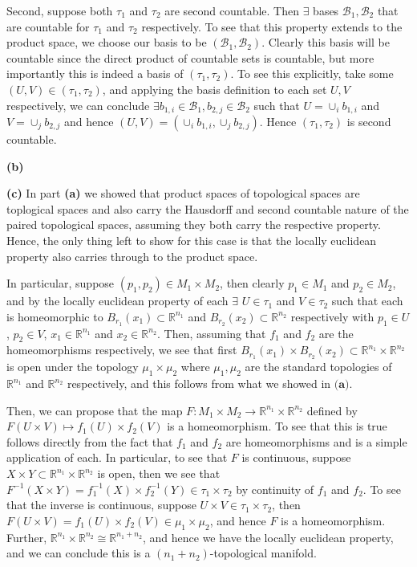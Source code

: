 \documentclass[10pt]{article}
\newcommand{\R}{\mathbb{R}}
\begin{document}
Second, suppose both $\tau_{1}$ and $\tau_{2}$ are second countable. Then $\exists$ bases $\mathcal{B}_{1},\mathcal{B}_{2}$ that are countable for $\tau_{1}$ and $\tau_{2}$ respectively. To see that this property extends to the product space, we choose our basis to be $(\mathcal{B}_{1},\mathcal{B}_{2})$. Clearly this basis will be countable since the direct product of countable sets is countable, but more importantly this is indeed a basis of $(\tau_{1},\tau_{2})$. To see this explicitly, take some $(U,V)\in (\tau_{1},\tau_{2})$, and applying the basis definition to each set $U,V$ respectively, we can conclude $\exists b_{1,i}\in \mathcal{B}_{1},b_{2,j}\in\mathcal{B}_{2}$ such that $U = \cup_{i}b_{1,i}$ and $V = \cup_{j}b_{2,j}$ and hence $(U,V) = (\cup_{i}b_{1,i},\cup_{j}b_{2,j})$. Hence $(\tau_{1},\tau_{2})$ is second countable.

\textbf{(b)} 

\textbf{(c)} In part \textbf{(a)} we showed that product spaces of topological spaces are toplogical spaces and also carry the Hausdorff and second countable nature of the paired topological spaces, assuming they both carry the respective property. Hence, the only thing left to show for this case is that the locally euclidean property also carries through to the product space.

In particular, suppose $(p_{1},p_{2})\in M_{1}\times M_{2}$, then clearly $p_{1}\in M_{1}$ and $p_{2}\in M_{2}$, and by the locally euclidean property of each $\exists$ $U\in \tau_{1}$ and $V\in \tau_{2}$ such that each is homeomorphic to $B_{r_{1}}(x_{1}) \subset \R^{n_{1}}$ and $B_{r_{2}}(x_{2}) \subset \R^{n_{2}}$ respectively with $p_{1}\in U$, $p_{2} \in V$, $x_{1} \in \R^{n_{1}}$ and $x_{2}\in \R^{n_{2}}$. Then, assuming that $f_{1}$ and $f_{2}$ are the homeomorphisms respectively, we see that first $B_{r_{1}}(x_{1})\times B_{r_{2}}(x_{2})\subset \R^{n_{1}}\times \R^{n_{2}}$ is open under the topology $\mu_{1}\times\mu_{2}$ where $\mu_{1},\mu_{2}$ are the standard topologies of $\R^{n_{1}}$ and $\R^{n_{2}}$ respectively, and this follows from what we showed in $\textbf{(a)}$.

Then, we can propose that the map $F: M_{1}\times M_{2} \to \R^{n_{1}}\times \R^{n_{2}}$ defined by $F(U\times V) \mapsto f_{1}(U)\times f_{2}(V)$ is a homeomorphism. To see that this is true follows directly from the fact that $f_{1}$ and $f_{2}$ are homeomorphisms and is a simple application of each. In particular, to see that $F$ is continuous, suppose $X\times Y \subset \R^{n_{1}}\times \R^{n_{2}}$ is open, then we see that $F^{-1}(X\times Y) = f_{1}^{-1}(X) \times f_{2}^{-1}(Y) \in \tau_{1}\times \tau_{2}$ by continuity of $f_{1}$ and $f_{2}$. To see that the inverse is continuous, suppose $U\times V \in \tau_{1}\times \tau_{2}$, then $F(U\times V) = f_{1}(U)\times f_{2}(V) \in \mu_{1}\times \mu_{2}$, and hence $F$ is a homeomorphism. Further, $\R^{n_{1}}\times \R^{n_{2}} \cong \R^{n_{1}+n_{2}}$, and hence we have the locally euclidean property, and we can conclude this is a $(n_{1}+n_{2})$-topological manifold.
\end{document}
